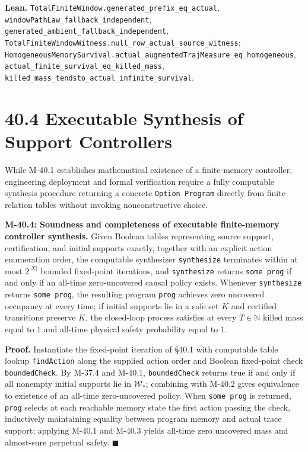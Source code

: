 \documentclass[
  english,
  11pt,
  oneside]{book}
\newcounter{none} %
\begin{document}
\textbf{Lean.} \nolinkurl{TotalFiniteWindow.generated_prefix_eq_actual}, \nolinkurl{windowPathLaw_fallback_independent}, \nolinkurl{generated_ambient_fallback_independent}, \nolinkurl{TotalFiniteWindowWitness.null_row_actual_source_witness}; \nolinkurl{HomogeneousMemorySurvival.actual_augmentedTrajMeasure_eq_homogeneous}, \nolinkurl{actual_finite_survival_eq_killed_mass}, \nolinkurl{killed_mass_tendsto_actual_infinite_survival}.

\section{40.4 Executable Synthesis of Support Controllers}\label{executable-synthesis-of-support-controllers}

While M-40.1 establishes mathematical existence of a finite-memory controller, engineering deployment and formal verification require a fully computable synthesis procedure returning a concrete \nolinkurl{Option Program} directly from finite relation tables without invoking nonconstructive choice.

\hypertarget{m-40-4}{}\label{m-40-4}

\textbf{M-40.4: Soundness and completeness of executable finite-memory controller synthesis.} Given Boolean tables representing source support, certification, and initial supports exactly, together with an explicit action enumeration order, the computable synthesizer \texttt{synthesize} terminates within at most \(2^{|X|}\) bounded fixed-point iterations, and \texttt{synthesize} returns \texttt{some\ prog} if and only if an all-time zero-uncovered causal policy exists. Whenever \texttt{synthesize} returns \texttt{some\ prog}, the resulting program \texttt{prog} achieves zero uncovered occupancy at every time; if initial supports lie in a safe set \(K\) and certified transitions preserve \(K\), the closed-loop process satisfies at every \(T\in\mathbb N\) killed mass equal to \(1\) and all-time physical safety probability equal to \(1\).

\textbf{Proof.} Instantiate the fixed-point iteration of §40.1 with computable table lookup \texttt{findAction} along the supplied action order and Boolean fixed-point check \texttt{boundedCheck}. By M-37.4 and M-40.1, \texttt{boundedCheck} returns true if and only if all nonempty initial supports lie in \(\mathcal W_*\); combining with M-40.2 gives equivalence to existence of an all-time zero-uncovered policy. When \texttt{some\ prog} is returned, \texttt{prog} selects at each reachable memory state the first action passing the check, inductively maintaining equality between program memory and actual trace support; applying M-40.1 and M-40.3 yields all-time zero uncovered mass and almost-sure perpetual safety. \(\blacksquare\)
\end{document}
